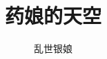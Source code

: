 \documentclass[preprint,12pt]{elsarticle}
\numberwithin{equation}{section}
\begin{document}
\tableofcontents
	\begin{frontmatter}
		\title{药娘的天空}
		\author[label1]{乱世银娘}
\end{frontmatter}
\newpage

\newpage

\newpage




\end{document}

